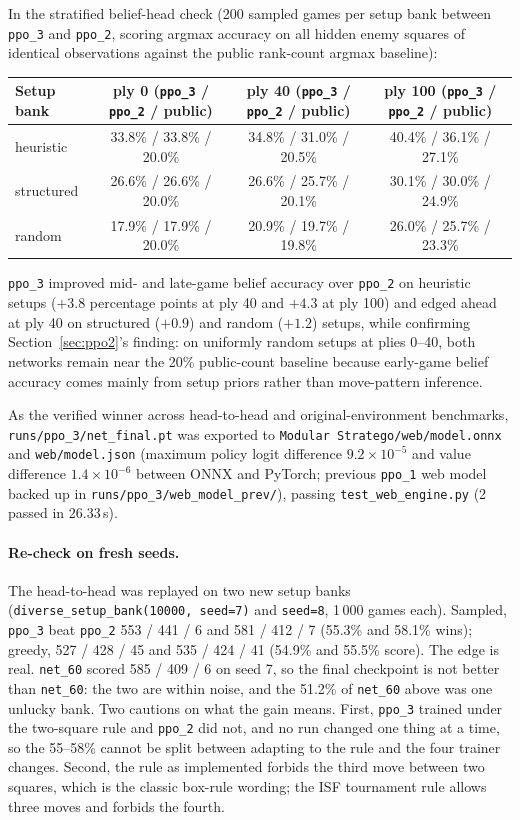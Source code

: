 In the stratified belief-head check (200 sampled games per setup bank between \texttt{ppo\_3} and
\texttt{ppo\_2}, scoring argmax accuracy on all hidden enemy squares of identical observations
against the public rank-count argmax baseline):
\begin{center}
\small
\begin{tabular}{lccc}
\toprule
Setup bank & ply 0 (\texttt{ppo\_3} / \texttt{ppo\_2} / public) & ply 40 (\texttt{ppo\_3} / \texttt{ppo\_2} / public) & ply 100 (\texttt{ppo\_3} / \texttt{ppo\_2} / public) \\
\midrule
heuristic  & 33.8\% / 33.8\% / 20.0\% & 34.8\% / 31.0\% / 20.5\% & 40.4\% / 36.1\% / 27.1\% \\
structured & 26.6\% / 26.6\% / 20.0\% & 26.6\% / 25.7\% / 20.1\% & 30.1\% / 30.0\% / 24.9\% \\
random     & 17.9\% / 17.9\% / 20.0\% & 20.9\% / 19.7\% / 19.8\% & 26.0\% / 25.7\% / 23.3\% \\
\bottomrule
\end{tabular}
\end{center}
\texttt{ppo\_3} improved mid- and late-game belief accuracy over \texttt{ppo\_2} on heuristic
setups ($+3.8$ percentage points at ply 40 and $+4.3$ at ply 100) and edged ahead at ply 40 on
structured ($+0.9$) and random ($+1.2$) setups, while confirming Section~\ref{sec:ppo2}'s
finding: on uniformly random setups at plies 0--40, both networks remain near the 20\% public-count
baseline because early-game belief accuracy comes mainly from setup priors rather than move-pattern
inference.

As the verified winner across head-to-head and original-environment benchmarks,
\texttt{runs/ppo\_3/net\_final.pt} was exported to \texttt{Modular Stratego/web/model.onnx} and
\texttt{web/model.json} (maximum policy logit difference $9.2 \times 10^{-5}$ and value difference
$1.4 \times 10^{-6}$ between ONNX and PyTorch; previous \texttt{ppo\_1} web model backed up in
\texttt{runs/ppo\_3/web\_model\_prev/}), passing \texttt{test\_web\_engine.py} (2 passed in
26.33\,s).

\paragraph{Re-check on fresh seeds.} The head-to-head was replayed on two new setup banks
(\texttt{diverse\_setup\_bank(10000, seed=7)} and \texttt{seed=8}, 1\,000 games each). Sampled,
\texttt{ppo\_3} beat \texttt{ppo\_2} 553 / 441 / 6 and 581 / 412 / 7 (55.3\% and 58.1\% wins);
greedy, 527 / 428 / 45 and 535 / 424 / 41 (54.9\% and 55.5\% score). The edge is real.
\texttt{net\_60} scored 585 / 409 / 6 on seed 7, so the final checkpoint is not better than
\texttt{net\_60}: the two are within noise, and the 51.2\% of \texttt{net\_60} above was one
unlucky bank. Two cautions on what the gain means. First, \texttt{ppo\_3} trained under the
two-square rule and \texttt{ppo\_2} did not, and no run changed one thing at a time, so the 55--58\%
cannot be split between adapting to the rule and the four trainer changes. Second, the rule as
implemented forbids the third move between two squares, which is the classic box-rule wording;
the ISF tournament rule allows three moves and forbids the fourth.

